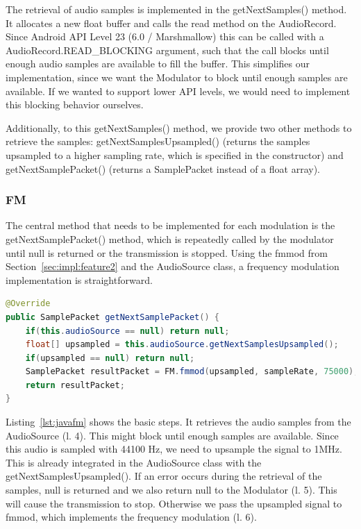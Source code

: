 The retrieval of audio samples is implemented in the getNextSamples() method. It allocates a new float buffer and calls the read method on the AudioRecord. Since Android API Level 23 (6.0 / Marshmallow) this can be called with a AudioRecord.READ\_BLOCKING argument, such that the call blocks until enough audio samples are available to fill the buffer. This simplifies our implementation, since we want the Modulator to block until enough samples are available. If we wanted to support lower API levels, we would need to implement this blocking behavior ourselves.

Additionally, to this getNextSamples() method, we provide two other methods to retrieve the samples: getNextSamplesUpsampled() (returns the samples upsampled to a higher sampling rate, which is specified in the constructor) and  getNextSamplePacket() (returns a SamplePacket instead of a float array).

\subsubsection{FM}

The central method that needs to be implemented for each modulation is the getNextSamplePacket() method, which is repeatedly called by the modulator until null is returned or the transmission is stopped. Using the fmmod from Section~\ref{sec:impl:feature2} and the AudioSource class, a frequency modulation implementation is straightforward. 

\begin{lstlisting}[label=lst:javafm, caption=Modulating microphone samples using frequency modulation, language=java,]
@Override
public SamplePacket getNextSamplePacket() {
	if(this.audioSource == null) return null;
	float[] upsampled = this.audioSource.getNextSamplesUpsampled();
	if(upsampled == null) return null;
	SamplePacket resultPacket = FM.fmmod(upsampled, sampleRate, 75000);
	return resultPacket;
}
\end{lstlisting}

Listing~\ref{lst:javafm} shows the basic steps. It retrieves the audio samples from the AudioSource (l. 4). This might block until enough samples are available. Since this audio is sampled with 44100 Hz, we need to upsample the signal to 1MHz. This is already integrated in the AudioSource class with the getNextSamplesUpsampled(). If an error occurs during the retrieval of the samples, null is returned and we also return null to the Modulator (l. 5). This will cause the transmission to stop. Otherwise we pass the upsampled signal to fmmod, which implements the frequency modulation (l. 6). 

